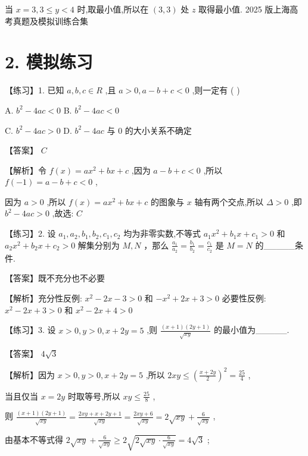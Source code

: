 \documentclass[10pt]{article}
\begin{document}
当 \(x = 3,3 \leq  y < 4\) 时,取最小值,所以在 \(\left( {3,3}\right)\) 处 \(z\) 取得最小值. 2025 版上海高考真题及模拟训练合集

\section*{2. 模拟练习}

【练习】1. 已知 \(a,b,c \in  R\) ,且 \(a > 0,a - b + c < 0\) ,则一定有 ( )

A. \({b}^{2} - {4ac} < 0\) B. \({b}^{2} - {4ac} < 0\)

C. \({b}^{2} - {4ac} > 0\) D. \({b}^{2} - {4ac}\) 与 0 的大小关系不确定

【答案】 \(C\)

【解析】令 \(f\left( x\right)  = a{x}^{2} + {bx} + c\) ,因为 \(a - b + c < 0\) ,所以 \(f\left( {-1}\right)  = a - b + c < 0\) ,

因为 \(a > 0\) ,所以 \(f\left( x\right)  = a{x}^{2} + {bx} + c\) 的图象与 \(x\) 轴有两个交点,所以 \(\Delta  > 0\) ,即 \({b}^{2} - {4ac} > 0\) ,故选: \(C\)

【练习】2. 设 \({a}_{1},{a}_{2},{b}_{1},{b}_{2},{c}_{1},{c}_{2}\) 均为非零实数,不等式 \({a}_{1}{x}^{2} + {b}_{1}x + {c}_{1} > 0\) 和 \({a}_{2}{x}^{2} + {b}_{2}x + {c}_{2} > 0\) 解集分别为 \(M,N\) ，那么 \(\frac{{a}_{1}}{{a}_{2}} = \frac{{b}_{1}}{{b}_{2}} = \frac{{c}_{1}}{{c}_{2}}\) 是 \(M = N\) 的\_\_\_\_\_条件.

【答案】既不充分也不必要

【解析】充分性反例: \({x}^{2} - {2x} - 3 > 0\) 和 \(- {x}^{2} + {2x} + 3 > 0\) 必要性反例: \({x}^{2} - {2x} + 3 > 0\) 和 \({x}^{2} - {2x} + 4 > 0\)

【练习】3. 设 \(x > 0,y > 0,x + {2y} = 5\) ,则 \(\frac{\left( {x + 1}\right) \left( {{2y} + 1}\right) }{\sqrt{xy}}\) 的最小值为\_\_\_\_\_.

【答案】 \(4\sqrt{3}\)

【解析】因为 \(x > 0,y > 0,x + {2y} = 5\) ,所以 \({2xy} \leq  {\left( \frac{x + {2y}}{2}\right) }^{2} = \frac{25}{4}\) ,

当且仅当 \(x = {2y}\) 时取等号,所以 \({xy} \leq  \frac{25}{8}\) ,

则 \(\frac{\left( {x + 1}\right) \left( {{2y} + 1}\right) }{\sqrt{xy}} = \frac{{2xy} + x + {2y} + 1}{\sqrt{xy}} = \frac{{2xy} + 6}{\sqrt{xy}} = 2\sqrt{xy} + \frac{6}{\sqrt{xy}}\) ,

由基本不等式得 \(2\sqrt{xy} + \frac{6}{\sqrt{xy}} \geq  2\sqrt{2\sqrt{xy} \cdot  \frac{6}{\sqrt{xy}}} = 4\sqrt{3}\) ;
\end{document}
